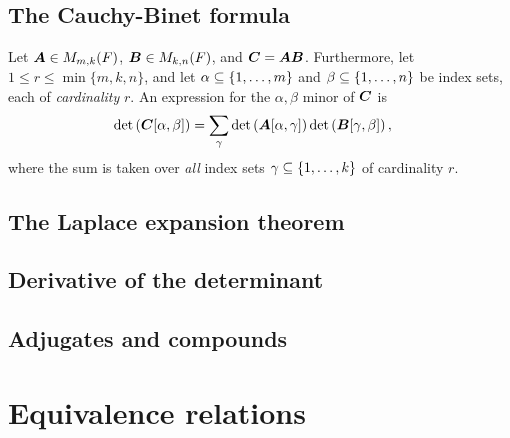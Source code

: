 \documentclass[11pt]{article}
\begin{document}
\subsection{The Cauchy-Binet formula}
Let $\boldsymbol{A} \in M_{m, k}(F)$, $\boldsymbol{B} \in M_{k, n}(F)$, and $\boldsymbol{C} = \boldsymbol{A}\boldsymbol{B}$. Furthermore, let $1 \le r \le \min\{m, k, n\}$,
and let  $\alpha \subseteq \left\{1,\ldots, m\right\}$ and $\beta \subseteq \left\{1,\ldots,n\right\}$  be index sets, each of \emph{cardinality} $r$. An
expression for the $\alpha, \beta$ minor of $\boldsymbol{C}$ is
\begin{align}
\det\left(\boldsymbol{C}[\alpha, \beta]\right) &= \sum_{\gamma}\det\left(\boldsymbol{A}[\alpha, \gamma]\right)\det\left(\boldsymbol{B}[\gamma, \beta]\right), \label{eqn: cauchy_binet}
\end{align} where the sum is taken over \emph{all} index sets  $\gamma \subseteq  \left\{1,\ldots, k\right\}$ of cardinality $r$.

\subsection{The Laplace expansion theorem}



\subsection{Derivative of the determinant}

\subsection{Adjugates and compounds}

\section{Equivalence relations}

\newpage


\end{document}
